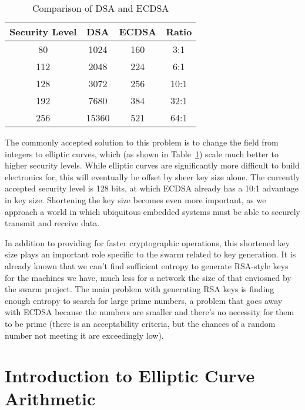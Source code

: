 \documentclass[twocolumn]{article}
\begin{document}
\begin{table}[h]
  \begin{center}
    \begin{tabular}{cccc}
      Security Level & DSA & ECDSA & Ratio \\
      \hline
      80 & 1024 & 160 & 3:1 \\
      112 & 2048 & 224 & 6:1 \\
      128 & 3072 & 256 & 10:1 \\
      192 & 7680 & 384 & 32:1 \\
      256 & 15360 & 521 & 64:1 \\
    \end{tabular}
  \end{center}

  \caption{Comparison of DSA and ECDSA\cite{nsa-case_for_ecc}
    \label{key-sizes}}
\end{table}

The commonly accepted solution to this problem is to change the field
from integers to elliptic curves, which (as shown in
Table~\ref{key-sizes}) scale much better to higher security levels.
While elliptic curves are significantly more difficult to build
electronics for, this will eventually be offset by sheer key size
alone.  The currently accepted security level is 128 bits, at which
ECDSA already has a 10:1 advantage in key size.  Shortening the key 
size becomes even more important, as we approach a world in which 
ubiquitous embedded systems must be able to securely transmit and 
receive data.

In addition to providing for faster cryptographic operations, this
shortened key size plays an important role specific to the swarm
related to key generation.  It is already known\cite{halderman-shared}
that we can't find sufficient entropy to generate RSA-style keys for
the machines we have, much less for a network the size of that
enviosned by the swarm project.  The main problem with generating RSA
keys is finding enough entropy to search for large prime numbers, a
problem that goes away with ECDSA because the numbers are smaller and
there's no necessity for them to be prime (there is an acceptability
criteria, but the chances of a random number not meeting it are
exceedingly low).

\section{Introduction to Elliptic Curve Arithmetic}
\end{document}
